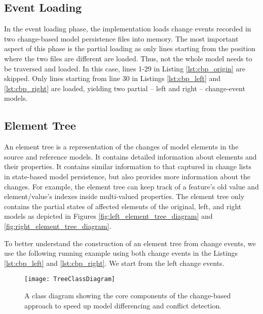 \subsection{Event Loading}
\label{sec:event_loading}
In the event loading phase, the implementation loads change events recorded in two change-based model persistence files into memory.
The most important aspect of this phase is the partial loading as only lines starting from the position where the two files are different are loaded.
Thus, not the whole model needs to be traversed and loaded.
In this case, lines 1-29 in Listing \ref{lst:cbp_origin} are skipped. Only lines starting from line 30 in Listings \ref{lst:cbp_left} and \ref{lst:cbp_right} are loaded, yielding two partial -- left and right -- change-event models. 

\subsection{Element Tree}
\label{sec:tree_construction}
An element tree is a representation of the changes of model elements in the source and reference models. It contains detailed information about elements and their properties. It contains similar information to that captured in change lists in state-based model persistence, but also provides more information about the changes. For example, the element tree can keep track of a feature's old value and element/value's indexes inside multi-valued properties. The element tree only contains the partial states of affected elements of the original, left, and right models as depicted in Figures \ref{fig:left_element_tree_diagram} and \ref{fig:right_element_tree_diagram}.

To better understand the construction of an element tree from change events, we use the following running example using both change events in the Listings \ref{lst:cbp_left} and \ref{lst:cbp_right}. We start from the left change events. 

\begin{landscape}
  \begin{figure}
    \texttt{[image: TreeClassDiagram]}
    \caption{A class diagram showing the core components of the change-based approach to speed up model differencing and conflict detection.}
    \label{fig:approach_class_diagram}
  \end{figure}
\end{landscape}


